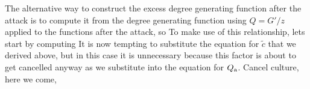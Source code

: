 The alternative way to construct the excess degree generating function after the attack is to compute it from the degree generating function using $Q=G'/z$ applied to the functions after the attack, so 
To make use of this relationship, lets start by computing 
It is now tempting to substitute the equation for $\tilde{c}$ that we derived above, but in this case it is unnecessary because this factor is about to get cancelled anyway as we substitute into the equation for $Q_{\rm a}$. Cancel culture, here we come,

